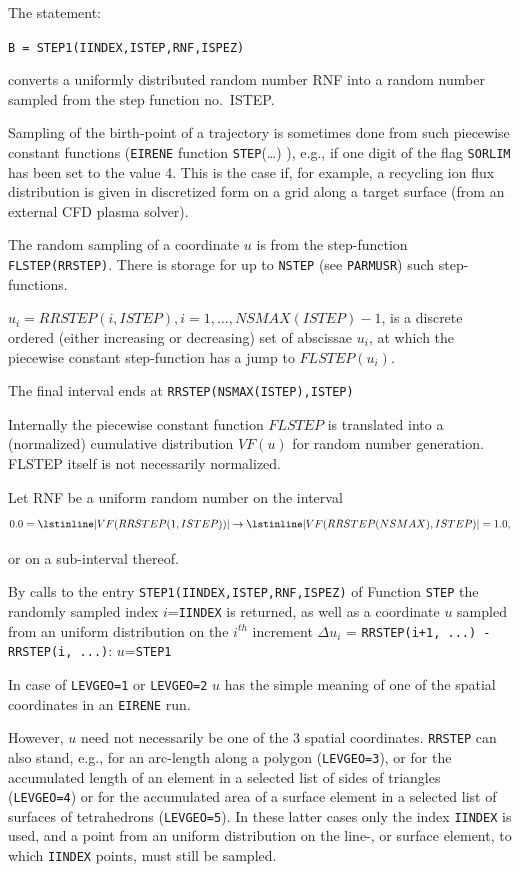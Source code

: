 The statement:

\lstinline|B = STEP1(IINDEX,ISTEP,RNF,ISPEZ)|

converts a uniformly distributed random number RNF into a random number sampled
from the step function	no.\ ISTEP.

\medskip

Sampling of the birth-point of a trajectory is sometimes done from such
piecewise constant functions (\lstinline|EIRENE| function
\lstinline|STEP|(\dots) ), e.g., if one digit of the flag
\lstinline|SORLIM| has been set to the value 4.
This is the case if, for example, a recycling ion flux distribution is given in
discretized form on a grid along a target surface (from an external \ac{CFD}
plasma solver).

The random sampling of a coordinate $u$ is from the step-function
\lstinline|FLSTEP(RRSTEP)|.
There is storage for up to \lstinline|NSTEP| (see \lstinline|PARMUSR|)
such step-functions.

$u_i = RRSTEP(i,ISTEP), i = 1, \dots, NSMAX(ISTEP) - 1$, is a discrete ordered
(either increasing or decreasing) set of abscissae $u_i$, at which the
piecewise constant step-function has a jump to $FLSTEP(u_i)$.

The final interval ends at \lstinline|RRSTEP(NSMAX(ISTEP),ISTEP)| 

Internally the piecewise constant function $FLSTEP$ is translated into a
(normalized) cumulative distribution $VF(u)$ for random number generation.
FLSTEP itself is not necessarily normalized.

Let RNF be a uniform random number on the interval
\begin{equation}
  \nonumber
  0.0 =\lstinline|VF(RRSTEP(1,ISTEP))| \rightarrow \lstinline|VF(RRSTEP(NSMAX),ISTEP)| = 1.0,
\end{equation}

or on a sub-interval thereof.

By calls to the entry \lstinline|STEP1(IINDEX,ISTEP,RNF,ISPEZ)| of Function
\lstinline|STEP| the randomly sampled index $i$=\lstinline|IINDEX|
is returned, as well as a coordinate $u$ sampled from an uniform distribution
on the $i^{th}$ increment $\Delta u_i$ = \lstinline|RRSTEP(i+1, ...) - RRSTEP(i, ...)|:
$u$=\lstinline|STEP1| 

In case of \lstinline|LEVGEO=1| or \lstinline|LEVGEO=2| $u$ has the
simple meaning of one of the spatial coordinates in an \lstinline|EIRENE|
run.

However, $u$ need not necessarily be one of the 3 spatial coordinates.
\lstinline|RRSTEP| can also stand, e.g., for an arc-length along
a polygon (\lstinline|LEVGEO=3|), or for the accumulated length of an
element in
a selected list of sides of triangles (\lstinline|LEVGEO=4|) or for the
accumulated area of a surface element in a selected list of surfaces
of tetrahedrons (\lstinline|LEVGEO=5|).
In these latter cases only the index \lstinline|IINDEX| is used, and a
point from an uniform distribution on the line-, or  surface element, to which
\lstinline|IINDEX| points, must still be sampled.


